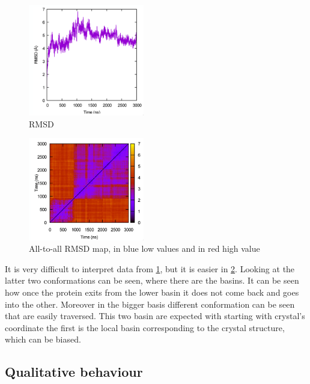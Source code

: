 \begin{multicols}{2}

	\begin{figure}[H]
		\includegraphics[width = 0.45\textwidth]{rmsd}
		\caption{RMSD}
		\label{fig:rmsd}
	\end{figure}

	\columnbreak

	\begin{figure}[H]
		\includegraphics[width = 0.45\textwidth]{all-to-all-rmsd}
		\caption{All-to-all RMSD map, in blue low values and in red high value}
		\label{fig:all-to-all-rmsd}
	\end{figure}

\end{multicols}

It is very difficult to interpret data from \ref{fig:rmsd}, but it is easier in \ref{fig:all-to-all-rmsd}.
Looking at the latter two conformations can be seen, where there are the basins.
It can be seen how once the protein exits from the lower basin it does not come back and goes into the other.
Moreover in the bigger basis different conformation can be seen that are easily traversed.
This two basin are expected with starting with crystal's coordinate the first is the local basin corresponding to the crystal structure, which can be biased.

	\subsection{Qualitative behaviour}

